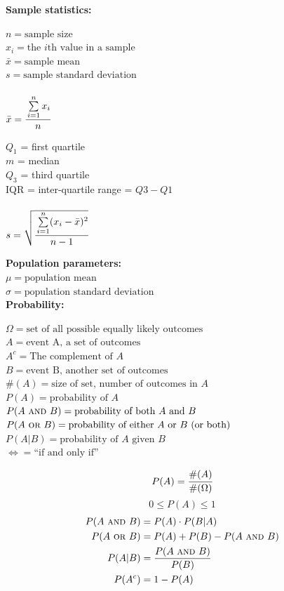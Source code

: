 \documentclass[12pt,letterpaper,addpoints]{exam}
\begin{document}

\newpage

{\bf Sample statistics:}\vspace{-10pt}
\begin{multicols}{2}\noindent
$n=\text{sample size} $\\
$x_i=\text{the $i$th value in a sample} $\\
$\bar x = \text{sample mean}$\\
$s = \text{sample standard deviation}$\\\\
$\bar x = \cfrac{\sum\limits_{i=1}^n x_i}{n}$

\columnbreak \noindent
$Q_1$ = first quartile\\
$m$ = median\\
$Q_3$ = third quartile\\
IQR = inter-quartile range = $Q3-Q1$\\\\
$s = \sqrt{\cfrac{\sum\limits_{i=1}^n (x_i-\bar x)^2}{n-1}}$ 
\end{multicols}

{\bf Population parameters:}\\
$\mu = \text{population mean}$\\
$\sigma = \text{population standard deviation}$\\

{\bf Probability:}
\begin{multicols}{2} \noindent
$\Omega = \text{set of all possible equally likely outcomes}$\\
$A = \text{event A, a set of outcomes}$\\
$A^c = \text{The complement of }A$\\
$B = \text{event B, another set of outcomes}$\\
$\#(A) = \text{size of set, number of outcomes in } A$\\
$P(A) = \text{probability of }A$\\
$P(A ~\textsc{and}~ B) = \text{probability of both $A$ and $B$}$\\
$P(A ~\textsc{or}~ B) = \text{probability of either $A$ or $B$ (or both)}$\\
$P(A | B) = \text{probability of $A$ given $B$}$\\
$\iff = \text{``if and only if''}$
\columnbreak

$$P(A) = \cfrac{\#(A)}{\#(\Omega)}$$
$$0 \le P(A) \le 1$$
\begin{align*}
P(A ~\textsc{and}~ B) &= P(A) \cdot P(B|A) \\
P(A ~\textsc{or}~ B) &= P(A) + P(B) - P(A~\textsc{and}~ B)\\
P(A|B) &= \frac{P(A ~\textsc{and}~ B)}{P(B)} \\
P(A^c) &= 1 - P(A)
\end{align*}
\end{multicols}
\end{document}
